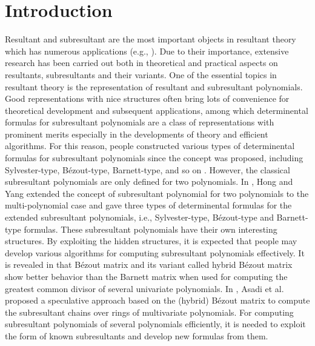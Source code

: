 \documentclass{article}
\begin{document}
\section{Introduction}
Resultant and subresultant are the most important objects in resultant theory which has numerous applications (e.g., \cite{wang1998,wang2000,kapur1994,collins1991,arnon1984}).
Due to their importance,
extensive research has been carried out both in theoretical and practical aspects on resultants, subresultants and their variants\cite{sylvester1853,lascoux2003,collins1967,barnett1971greatest,terui2008,bostan2017,hong2021subresultant,cox2021,hy2021}. One of the essential topics in resultant theory is the representation of resultant and subresultant polynomials. Good representations with nice structures often bring lots of convenience for theoretical development and subsequent applications, among which determinental formulas for subresultant polynomials are a class of representations with prominent merits especially in the developments of theory and efficient algorithms. For this reason, people constructed various types of determinental formulas for subresultant polynomials since the concept was proposed, including Sylvester-type\cite{sylvester1853,li2006}, B\'ezout-type\cite{houwang2000},  Barnett-type\cite{barnett1983,diaz2002}, and so on \cite{diaz2004various}.
However, the classical subresultant polynomials are only defined for two polynomials. In \cite{hong2021subresultant}, Hong and Yang extended the concept of subresultant polynomial for two polynomials to the multi-polynomial case and gave three types of determinental formulas for the extended subresultant polynomials, i.e., Sylvester-type, B\'ezout-type and Barnett-type formulas.
These subresultant polynomials have their own interesting structures. By exploiting the hidden structures, it is expected that people may develop various algorithms for computing subresultant polynomials effectively.
%
It is revealed in \cite{diaz2004various} that B\'ezout matrix and its variant called hybrid B\'ezout matrix show better behavior than the Barnett matrix when used for computing the greatest common divisor of several univariate polynomials. In \cite{asadi2022subresultant}, Asadi et al. proposed a  speculative approach based on the (hybrid) B\'ezout matrix to compute the subresultant chains over rings of multivariate polynomials. For computing  subresultant  polynomials of several polynomials efficiently, it is  needed to exploit the form of known subresultants and develop new formulas from them.
\end{document}
